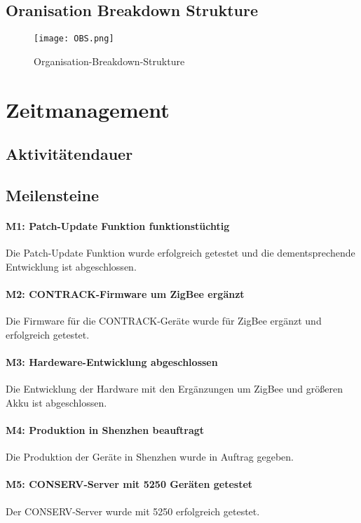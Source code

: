 \subsection{Oranisation Breakdown Strukture}
\begin{figure}[H]
    \begin{center}
        \texttt{[image: OBS.png]}
    \end{center}
    \caption{Organisation-Breakdown-Strukture}
\end{figure}
\section{Zeitmanagement}
\subsection{Aktivitätendauer}


\subsection{Meilensteine}

\paragraph{M1: Patch-Update Funktion funktionstüchtig} Die Patch-Update Funktion wurde erfolgreich getestet und die dementsprechende Entwicklung ist abgeschlossen.
\paragraph{M2: CONTRACK-Firmware um ZigBee ergänzt} Die Firmware für die CONTRACK-Geräte wurde für ZigBee ergänzt und erfolgreich getestet.
\paragraph{M3: Hardeware-Entwicklung abgeschlossen} Die Entwicklung der Hardware mit den Ergänzungen um ZigBee und größeren Akku ist abgeschlossen.
\paragraph{M4: Produktion in Shenzhen beauftragt} Die Produktion der Geräte in Shenzhen wurde in Auftrag gegeben.
\paragraph{M5: CONSERV-Server mit 5250 Geräten getestet} Der CONSERV-Server wurde mit 5250 erfolgreich getestet.
